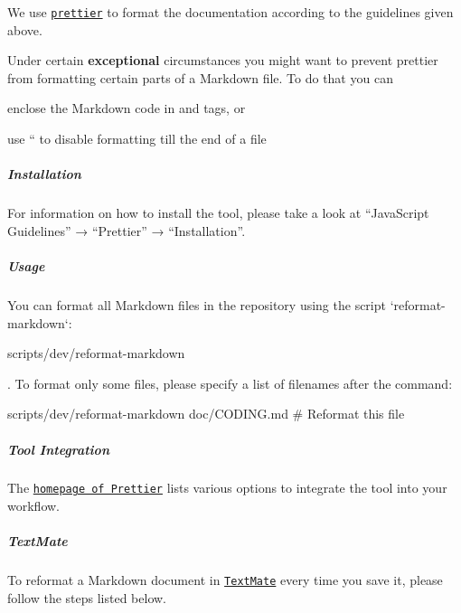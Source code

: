 We use \href{https://prettier.io}{\tt {\ttfamily prettier}} to format the documentation according to the guidelines given above.

Under certain {\bfseries exceptional} circumstances you might want to prevent {\ttfamily prettier} from formatting certain parts of a Markdown file. To do that you can


\begin{DoxyItemize}
\item enclose the Markdown code in {\ttfamily and} tags, or
\item use `` to disable formatting till the end of a file
\end{DoxyItemize}

\label{invalid_invalid}%
%
\subparagraph*{Installation}

For information on how to install the tool, please take a look at “\+Java\+Script Guidelines” → “\+Prettier” → “\+Installation”.

\label{invalid_invalid}%
%
\subparagraph*{Usage}

You can format all Markdown files in the repository using the script `reformat-\/markdown`\+:


\begin{DoxyCode}
scripts/dev/reformat-markdown
\end{DoxyCode}


. To format only some files, please specify a list of filenames after the command\+:


\begin{DoxyCode}
scripts/dev/reformat-markdown doc/CODING.md # Reformat this file
\end{DoxyCode}


\label{invalid_invalid}%
%
\subparagraph*{Tool Integration}

The \href{https://prettier.io}{\tt homepage of Prettier} lists various options to integrate the tool into your workflow.

\subparagraph*{Text\+Mate}

To reformat a Markdown document in \href{https://macromates.com}{\tt Text\+Mate} every time you save it, please follow the steps listed below.


